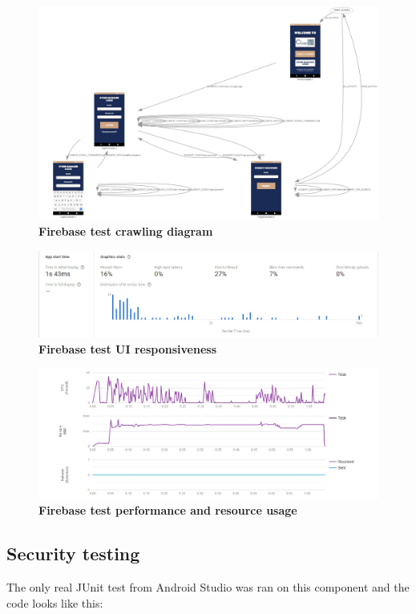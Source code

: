 \begin{figure}[H]
\centering
\includegraphics[width=\textwidth]{Images/TestingPics/Test1}
\caption{\label{fig:test26}\textbf{Firebase test crawling diagram}}
\end{figure}
\begin{figure}[H]
\centering
\includegraphics[width=\textwidth]{Images/TestingPics/Test2}
\caption{\label{fig:test27}\textbf{Firebase test UI responsiveness}}
\end{figure}
\begin{figure}[H]
\centering
\includegraphics[width=\textwidth]{Images/TestingPics/Test3}
\caption{\label{fig:test28}\textbf{Firebase test performance and resource usage}}
\end{figure}

\subsection{Security testing}
\hspace{\parindent} The only real JUnit test from Android Studio was ran on this component and the code looks like this:

